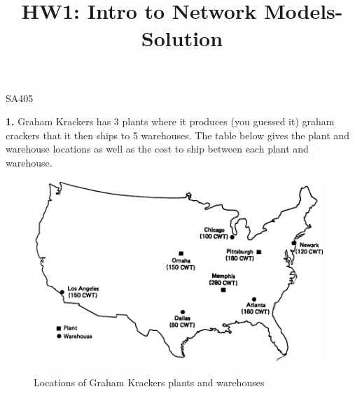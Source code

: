 \documentclass[11pt]{article}
\makeatletter
\theoremstyle{definition}
\renewcommand{\maketitle}{
  \noindent SA405 

  \begin{center}\Large{\textbf{\@title}}\end{center}
}
\makeatother
\begin{document}
\title{HW1: Intro to Network Models-Solution}

\maketitle

\textbf{1.} Graham Krackers has 3 plants where it produces (you guessed it) graham crackers that it then ships to 5 warehouses. The table below gives the plant and warehouse locations as well as the cost to ship between each plant and warehouse.

\begin{figure}[h!!!]
    \centering
    \includegraphics[width=4.3in]{map}\\
    \caption{Locations of Graham Krackers plants and warehouses}
\end{figure}
\end{document}
